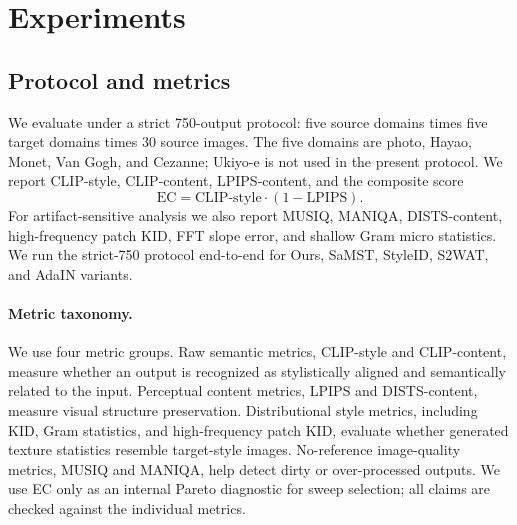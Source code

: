 ﻿\documentclass[letterpaper]{article}
\begin{document}
\section{Experiments}
\subsection{Protocol and metrics}
We evaluate under a strict 750-output protocol: five source domains times five target domains times 30 source images. The five domains are photo, Hayao, Monet, Van Gogh, and Cezanne; Ukiyo-e is not used in the present protocol. We report CLIP-style, CLIP-content, LPIPS-content, and the composite score
\begin{equation}
    \mathrm{EC} = \mathrm{CLIP\mbox{-}style}\cdot(1-\mathrm{LPIPS}).
\end{equation}
For artifact-sensitive analysis we also report MUSIQ, MANIQA, DISTS-content, high-frequency patch KID, FFT slope error, and shallow Gram micro statistics. We run the strict-750 protocol end-to-end for Ours, SaMST, StyleID, S2WAT, and AdaIN variants.

\paragraph{Metric taxonomy.}
We use four metric groups. Raw semantic metrics, CLIP-style and CLIP-content, measure whether an output is recognized as stylistically aligned and semantically related to the input. Perceptual content metrics, LPIPS and DISTS-content, measure visual structure preservation. Distributional style metrics, including KID, Gram statistics, and high-frequency patch KID, evaluate whether generated texture statistics resemble target-style images. No-reference image-quality metrics, MUSIQ and MANIQA, help detect dirty or over-processed outputs. We use EC only as an internal Pareto diagnostic for sweep selection; all claims are checked against the individual metrics.
\end{document}
